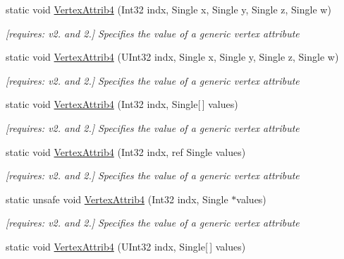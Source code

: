 \begin{DoxyCompactItemize}
static void \hyperlink{class_open_t_k_1_1_graphics_1_1_e_s20_1_1_g_l_a161bb3a37e83198b4c84bf3e54674c2e}{Vertex\-Attrib4} (Int32 indx, Single x, Single y, Single z, Single w)
\begin{DoxyCompactList}\small\item\em \mbox{[}requires\-: v2. and 2.\mbox{]} Specifies the value of a generic vertex attribute \end{DoxyCompactList}\item 
static void \hyperlink{class_open_t_k_1_1_graphics_1_1_e_s20_1_1_g_l_a0bac6cd6f8cb1413ae9d019fa17a3fea}{Vertex\-Attrib4} (U\-Int32 indx, Single x, Single y, Single z, Single w)
\begin{DoxyCompactList}\small\item\em \mbox{[}requires\-: v2. and 2.\mbox{]} Specifies the value of a generic vertex attribute \end{DoxyCompactList}\item 
static void \hyperlink{class_open_t_k_1_1_graphics_1_1_e_s20_1_1_g_l_a46fe9692fe6fdfade52fe8518953a4cc}{Vertex\-Attrib4} (Int32 indx, Single\mbox{[}$\,$\mbox{]} values)
\begin{DoxyCompactList}\small\item\em \mbox{[}requires\-: v2. and 2.\mbox{]} Specifies the value of a generic vertex attribute \end{DoxyCompactList}\item 
static void \hyperlink{class_open_t_k_1_1_graphics_1_1_e_s20_1_1_g_l_a21956943062d561615a6bd1cc0bf85c2}{Vertex\-Attrib4} (Int32 indx, ref Single values)
\begin{DoxyCompactList}\small\item\em \mbox{[}requires\-: v2. and 2.\mbox{]} Specifies the value of a generic vertex attribute \end{DoxyCompactList}\item 
static unsafe void \hyperlink{class_open_t_k_1_1_graphics_1_1_e_s20_1_1_g_l_af145331f97ebd28243a027596f4bb33b}{Vertex\-Attrib4} (Int32 indx, Single $\ast$values)
\begin{DoxyCompactList}\small\item\em \mbox{[}requires\-: v2. and 2.\mbox{]} Specifies the value of a generic vertex attribute \end{DoxyCompactList}\item 
static void \hyperlink{class_open_t_k_1_1_graphics_1_1_e_s20_1_1_g_l_acc539e35bfe125e88291b55ccec3745d}{Vertex\-Attrib4} (U\-Int32 indx, Single\mbox{[}$\,$\mbox{]} values)

\end{DoxyCompactItemize}
